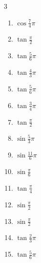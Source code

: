 \begin{multicols}{3}
\begin{enumerate}
  \item $\displaystyle \cos{\frac{7}{4}\pi}$

  \item $\displaystyle \tan{\frac{\pi}{2}}$
        \phantom{$\displaystyle \quad なし$}

  \item $\displaystyle \tan{\frac{5}{6}\pi}$

  \item $\displaystyle \tan{\frac{4}{3}\pi}$

  \item $\displaystyle \tan{\frac{5}{6}\pi}$

\columnbreak %

  \item $\displaystyle \tan{\frac{3}{4}\pi}$
        \phantom{$\displaystyle =-1$}

  \item $\displaystyle \tan{\frac{\pi}{2}}$
        \phantom{$\displaystyle \quad なし$}

  \item $\displaystyle \sin{\frac{5}{3}\pi}$

  \item $\displaystyle \sin{\frac{11}{6}\pi}$

  \item $\displaystyle \sin{\frac{\pi}{6}}$

  \item $\displaystyle \tan{\frac{\pi}{4}}$
        \phantom{$\displaystyle =1$}

  \item $\displaystyle \sin{\frac{\pi}{2}}$
        \phantom{$\displaystyle =1$}

  \item $\displaystyle \sin{\frac{\pi}{2}}$
        \phantom{$\displaystyle =1$}

  \item $\displaystyle \tan{\frac{2}{3}\pi}$

  \item $\displaystyle \tan{\frac{5}{6}\pi}$


\end{enumerate}
\end{multicols}
